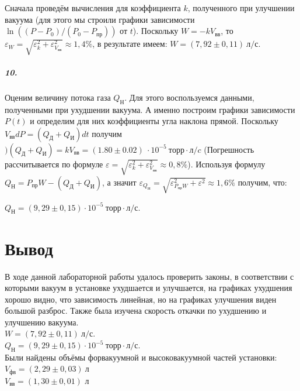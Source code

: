 \documentclass[a4paper,12pt]{article}
\begin{document}
Сначала проведём вычисления для коэффициента $k$, полученного при улучшении вакуума (для этого мы строили графики зависимости $\ln ((P-P_0) / (P_0 - P_{пр}))$ от $t$). Поскольку $W = -kV_{вв}$, то $\varepsilon_W = \sqrt{\varepsilon_k^2 + \varepsilon_{V_{вв}}^2} \approx 1,4\%$, в результате имеем: $W = (7,92 \pm 0,11) ~ л /с.$
\subparagraph*{10.} Оценим величину потока газа  $Q_Н$. Для этого воспользуемся данными, полученными при ухудшении вакуума. А именно построим графики зависимости $P(t)$ и определим для них коэффициенты угла наклона прямой. Поскольку $V_{вв}dP = (Q_Д + Q_И) dt$ получим $)(Q_Д + Q_И) = kV_{вв} = (1.80 \pm 0.02)~ \cdot 10^{-5} ~торр \cdot л / c $ (Погрешность рассчитывается по формуле $\varepsilon =  \sqrt{\varepsilon_k^2 + \varepsilon_{V_{вв}}^2} \approx 0,8\%$). 
Используя формулу $Q_Н = P_{пр}W - (Q_Д + Q_И)$, а значит $\varepsilon_{Q_Н} =  \sqrt{\varepsilon_{P_{пр}W}^2 + \varepsilon^2} \approx 1,6\%$ получим, что: 
 
 $
 Q_Н = (9,29 \pm 0,15) \cdot 10^{-5} ~ торр \cdot л / с.
 $
 
 \section*{Вывод}
 В ходе данной лабораторной работы удалось проверить законы, в соответствии с которыми вакуум в установке ухудшается и улучшается, на графиках ухудшения хорошо видно, что зависимость линейная, но на графиках улучшения виден большой разброс. Также была изучена скорость откачки по ухудшению и улучшению вакуума. \\$W = (7,92 \pm 0,11) ~ л /с.$ \\
 $
 Q_Н = (9,29 \pm 0,15) \cdot 10^{-5} ~ торр \cdot л / с.
 $\\
 Были найдены объёмы форвакуумной и высоковакуумной частей установки: \\
 $V_\text{фв} = (2,29\pm 0,03)~л$ \\
$V_\text{вв} = (1,30\pm 0,01)$ л
\end{document}
